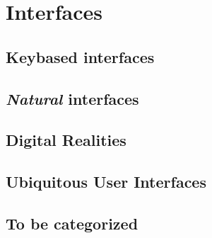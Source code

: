 \section{Interfaces}



\subsection{Keybased interfaces}






\subsection{\emph{Natural} interfaces}






\subsection{Digital Realities}




\subsection{Ubiquitous User Interfaces}  




\subsection{To be categorized}
\todo







